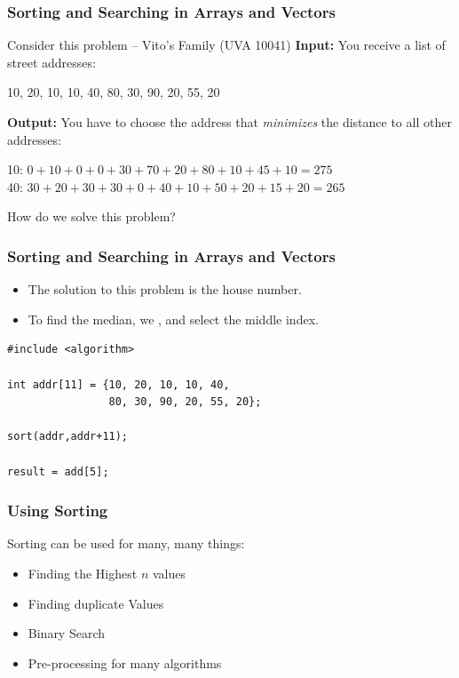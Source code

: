 \documentclass{beamer}
\begin{document}
\begin{frame}
  \frametitle{Sorting and Searching in Arrays and Vectors}

  \begin{block}{Consider this problem -- Vito's Family (UVA 10041)}
    {\bf Input:} You receive a list of street addresses:\\

    \smallskip
    
    10, 20, 10, 10, 40, 80, 30, 90, 20, 55, 20

    \bigskip

    {\bf Output:} You have to choose the address that \emph{minimizes}
    the distance to all other addresses:\\

    \smallskip

    10: $0+10+0+0+30+70+20+80+10+45+10 = 275$\\
    40: $30+20+30+30+0+40+10+50+20+15+20 = 265$\\
  \end{block}

  \bigskip

  How do we solve this problem?

\end{frame}
  
\begin{frame}[fragile]
  \frametitle{Sorting and Searching in Arrays and Vectors}

  \begin{itemize}
  \item The solution to this problem is the  house number.
  \item To find the median, we , and
    select the middle index.
  \end{itemize}
  
{\small
\begin{verbatim}
#include <algorithm>

int addr[11] = {10, 20, 10, 10, 40, 
                80, 30, 90, 20, 55, 20};

sort(addr,addr+11); 

result = add[5];
\end{verbatim}}

\end{frame}

\begin{frame}
  \frametitle{Using Sorting}
  Sorting can be used for many, many things:

  \bigskip

  {\smaller
    \begin{itemize}
    \item Finding the Highest $n$ values
    \item Finding duplicate Values
    \item Binary Search
    \item Pre-processing for many algorithms
    \end{itemize}
  }
\end{frame}
\end{document}
